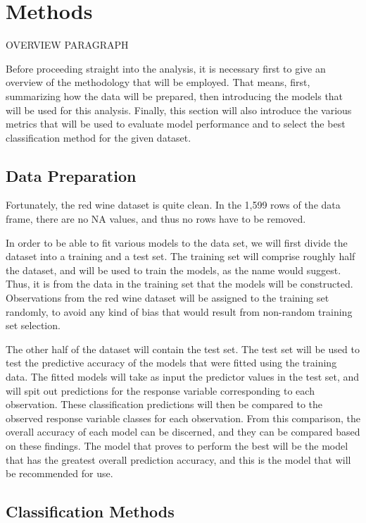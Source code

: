\documentclass[12pt]{article}
\begin{document}
\section{Methods}
\label{sec:meth}

OVERVIEW PARAGRAPH

Before proceeding straight into the analysis, it is necessary first to give an 
overview of the methodology that will be employed.  That means, first, summarizing 
how the data will be prepared, then introducing the models that will be used for 
this analysis.  Finally, this section will also introduce the various metrics that 
will be used to evaluate model performance and to select the best classification 
method for the given dataset.  

\subsection{Data Preparation}
\label{sec:prep}

Fortunately, the red wine dataset is quite clean.  In the 1,599 rows of the data 
frame, there are no NA values, and thus no rows have to be removed.  

In order to be able to fit various models to the data set, we will first divide the 
dataset into a training and a test set.  The training set will comprise roughly half 
the dataset, and will be used to train the models, as the name would suggest.  Thus, 
it is from the data in the training set that the models will be constructed.  
Observations from the red wine dataset will be assigned to the training set randomly, 
to avoid any kind of bias that would result from non-random training set selection.  

The other half of the dataset will contain the test set.  The test set will be used to 
test the predictive accuracy of the models that were fitted using the training data.  
The fitted models will take as input the predictor values in the test set, and will 
spit out predictions for the response variable corresponding to each observation.  
These classification predictions will then be compared to the observed response variable 
classes for each observation.  From this comparison, the overall accuracy of each model 
can be discerned, and they can be compared based on these findings.  The model that 
proves to perform the best will be the model that has the greatest overall prediction 
accuracy, and this is the model that will be recommended for use. 


\subsection{Classification Methods}
\label{sec:class}
\end{document}
